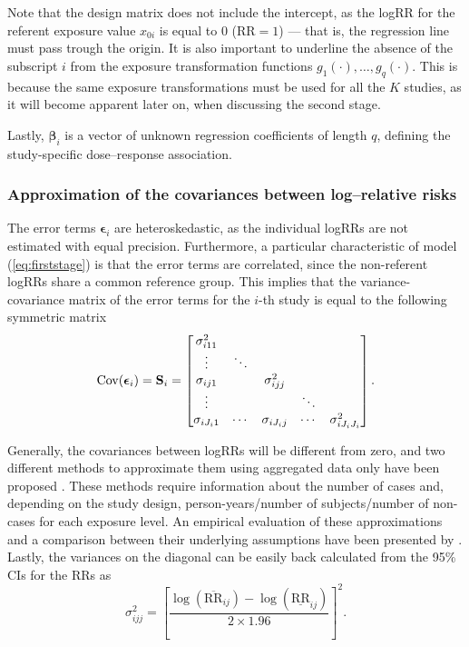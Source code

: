 Note that the design matrix does not include the intercept, as the logRR for the referent exposure value $x_{0i}$ is equal to 0 ($\mathrm{RR}=1$) --- that is, the regression line must pass trough the origin. It is also important to underline the absence of the subscript $i$ from the exposure transformation functions $g_1(\cdot), \ldots, g_q(\cdot)$. This is because the same exposure transformations must be used for all the $K$ studies, as it will become apparent later on, when discussing the second stage.

Lastly, $\boldsymbol{\beta}_i$ is a vector of unknown regression coefficients of length $q$, defining the study-specific dose--response association.

\subsubsection{Approximation of the covariances between log--relative risks}

The error terms $\boldsymbol{\epsilon}_i$ are heteroskedastic, as the individual logRRs are not estimated with equal precision.  Furthermore, a particular characteristic of model (\ref{eq:firststage}) is that the error terms are correlated, since the non-referent logRRs share a common reference group. This implies that the variance-covariance matrix of the error terms for the $i$-th study is equal to the  following symmetric matrix
\begin{equation*}
\operatorname{Cov}(\boldsymbol{\epsilon}_i) = \mathbf{S}_i =
	\begin{bmatrix}
		\sigma_{i11}^2 & & & & \\
		\vdots & \ddots & & & \\
		\sigma_{ij1} &  & \sigma_{ijj}^2 \\
		\vdots & & & \ddots \\
		\sigma_{iJ_{i}1} & \cdots & \sigma_{iJ_{i}j} & \cdots & \sigma_{iJ_iJ_i}^2
	\end{bmatrix}.
\end{equation*}

Generally, the covariances between logRRs will be different from zero, and two different methods to approximate them using aggregated data only have been proposed  \citep{greenland_methods_1992, hamling_facilitating_2008}. These methods require information about the number of cases and, depending on the study design, person-years/number of subjects/number of non-cases for each exposure level. An empirical evaluation of these approximations and a comparison between their underlying assumptions have been presented by \citet{orsini_metaanalysis_2012}. %
Lastly, the variances on the diagonal can be easily back calculated from the 95\% CIs for the RRs as 
\begin{equation*}
\sigma_{ijj}^2 = \left[ \frac{\log(\overline{\mathrm{RR}}_{ij})-\log(\underline{\mathrm{RR}}_{ij})}{2 \times 1.96} \right]^2.
\end{equation*}

